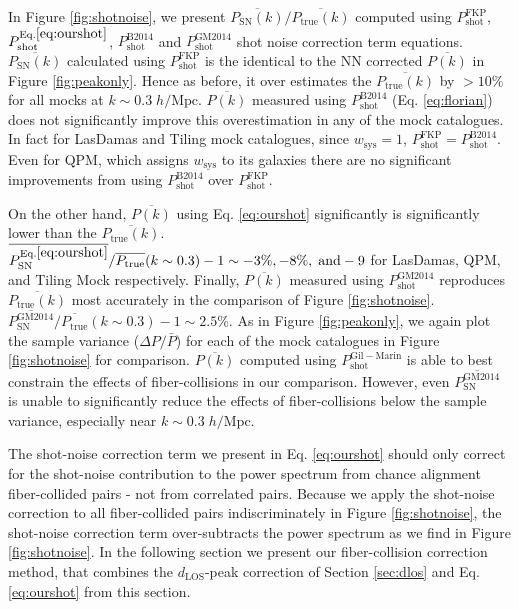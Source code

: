 \documentclass{emulateapj}
\begin{document}
In Figure \ref{fig:shotnoise}, we present $\overline{P_\mathrm{SN}(k)}/\overline{P_\mathrm{true}(k)}$ computed using $P^\mathrm{FKP}_\mathrm{shot}$, $P^\mathrm{Eq.\ref{eq:ourshot}}_\mathrm{shot}$, $P^\mathrm{B2014}_\mathrm{shot}$ and $P^\mathrm{GM2014}_\mathrm{shot}$ shot noise correction term equations. $\overline{P_\mathrm{SN}(k)}$ calculated using $P^\mathrm{FKP}_\mathrm{shot}$ is the identical to the NN corrected $\overline{P(k)}$ in Figure \ref{fig:peakonly}. Hence as before, it over estimates the $\overline{P_\mathrm{true}(k)}$ by $> 10 \%$ for all mocks at $k \sim 0.3 \; h/\mathrm{Mpc}$. $\overline{P(k)}$ measured using $P^\mathrm{B2014}_\mathrm{shot}$ (Eq. \ref{eq:florian}) does not significantly improve this overestimation in any of the mock catalogues. In fact for LasDamas and Tiling mock catalogues, since $w_\mathrm{sys} = 1$, $P^\mathrm{FKP}_\mathrm{shot} = P^\mathrm{B2014}_\mathrm{shot}$. Even for QPM, which assigns $w_\mathrm{sys}$ to its galaxies there are no significant improvements from using $P^\mathrm{B2014}_\mathrm{shot}$ over $P^\mathrm{FKP}_\mathrm{shot}$. 

On the other hand, $\overline{P(k)}$ using Eq. \ref{eq:ourshot} significantly is significantly lower than the $\overline{P_\mathrm{true}(k)}$. $\overline{P^\mathrm{Eq.\ref{eq:ourshot}}_\mathrm{SN}}/\overline{P_\mathrm{true}}(k\sim0.3) - 1 \sim -3 \%, -8 \%, \;\mathrm{and} -9$ for LasDamas, QPM, and Tiling Mock respectively. Finally, $\overline{P(k)}$ measured using $P^\mathrm{GM2014}_\mathrm{shot}$ reproduces $\overline{P_\mathrm{true}(k)}$ most accurately in the comparison of Figure \ref{fig:shotnoise}. $\overline{P^\mathrm{GM2014}_\mathrm{SN}}/\overline{P_\mathrm{true}}(k\sim 0.3) -1 \sim 2.5 \%$. As in Figure \ref{fig:peakonly}, we again plot the sample variance ($\Delta P/\bar{P}$) for each of the mock catalogues in Figure \ref{fig:shotnoise} for comparison. $\overline{P(k)}$ computed using $P^\mathrm{Gil-Marin}_\mathrm{shot}$ is able to best constrain the effects of fiber-collisions in our comparison. However, even $\overline{P^\mathrm{GM2014}_\mathrm{SN}}$ is unable to significantly reduce the effects of fiber-collisions below the sample variance, especially near $k \sim 0.3 \;h/\mathrm{Mpc}$. 

The shot-noise correction term we present in Eq. \ref{eq:ourshot} should only correct for the shot-noise contribution to the power spectrum from chance alignment fiber-collided pairs - not from correlated pairs. Because we apply the shot-noise correction to all fiber-collided pairs indiscriminately in Figure \ref{fig:shotnoise}, the shot-noise correction term over-subtracts the power spectrum as we find in Figure \ref{fig:shotnoise}. In the following section we present our fiber-collision correction method, that combines the $d_\mathrm{LOS}$-peak correction of Section \ref{sec:dlos} and Eq. \ref{eq:ourshot} from this section. 
\end{document}
